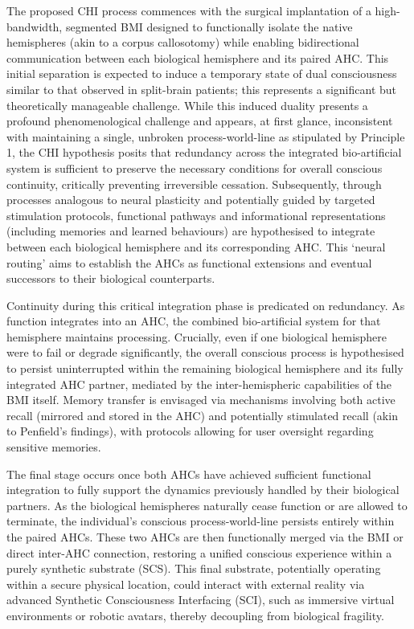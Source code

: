 \documentclass[10pt]{article}
\begin{document}
\begin{sloppypar}
  The proposed CHI process commences with the surgical implantation of a high-bandwidth, segmented BMI designed to functionally isolate the native hemispheres (akin to a corpus callosotomy) while enabling bidirectional communication between each biological hemisphere and its paired AHC. This initial separation is expected to induce a temporary state of dual consciousness similar to that observed in split-brain patients; this represents a significant but theoretically manageable challenge. While this induced duality presents a profound phenomenological challenge and appears, at first glance, inconsistent with maintaining a single, unbroken process-world-line as stipulated by Principle 1, the CHI hypothesis posits that redundancy across the integrated bio-artificial system is sufficient to preserve the necessary conditions for overall conscious continuity, critically preventing irreversible cessation. Subsequently, through processes analogous to neural plasticity and potentially guided by targeted stimulation protocols, functional pathways and informational representations (including memories and learned behaviours) are hypothesised to integrate between each biological hemisphere and its corresponding AHC. This ‘neural routing’ aims to establish the AHCs as functional extensions and eventual successors to their biological counterparts.

  Continuity during this critical integration phase is predicated on redundancy. As function integrates into an AHC, the combined bio-artificial system for that hemisphere maintains processing. Crucially, even if one biological hemisphere were to fail or degrade significantly, the overall conscious process is hypothesised to persist uninterrupted within the remaining biological hemisphere and its fully integrated AHC partner, mediated by the inter-hemispheric capabilities of the BMI itself. Memory transfer is envisaged via mechanisms involving both active recall (mirrored and stored in the AHC) and potentially stimulated recall (akin to Penfield’s findings), with protocols allowing for user oversight regarding sensitive memories.

  The final stage occurs once both AHCs have achieved sufficient functional integration to fully support the dynamics previously handled by their biological partners. As the biological hemispheres naturally cease function or are allowed to terminate, the individual’s conscious process-world-line persists entirely within the paired AHCs. These two AHCs are then functionally merged via the BMI or direct inter-AHC connection, restoring a unified conscious experience within a purely synthetic substrate (SCS). This final substrate, potentially operating within a secure physical location, could interact with external reality via advanced Synthetic Consciousness Interfacing (SCI), such as immersive virtual environments or robotic avatars, thereby decoupling from biological fragility.


\end{sloppypar}
\end{document}
